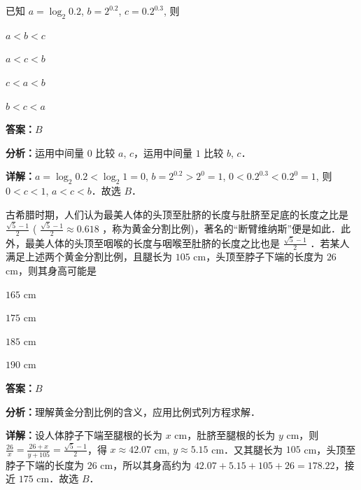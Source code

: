 \begin{question}[points=5]
已知 $a = \log_2 0.2$, $b = 2^{0.2}$, $c = 0.2^{0.3}$, 则
\begin{choices}
  \item $a < b < c$
  \item $a < c < b$
  \item $c < a < b$
  \item $b < c < a$
\end{choices}
\begin{solution}
\textbf{答案：}$B$

\textbf{分析：}运用中间量 $0$ 比较 $a$, $c$，运用中间量 $1$ 比较 $b$, $c$．

\textbf{详解：}$a = \log_2 0.2 < \log_2 1 = 0$, $b = 2^{0.2} > 2^0 = 1$, $0 < 0.2^{0.3} < 0.2^0 = 1$, 则 $0 < c < 1$, $a < c < b$．故选 $B$．
\end{solution}
\end{question}

\begin{question}[points=5]
古希腊时期，人们认为最美人体的头顶至肚脐的长度与肚脐至足底的长度之比是 $\frac{\sqrt{5} - 1}{2}$ ( $\frac{\sqrt{5} - 1}{2} \approx 0.618$ ，称为黄金分割比例)，著名的“断臂维纳斯”便是如此．此外，最美人体的头顶至咽喉的长度与咽喉至肚脐的长度之比也是 $\frac{\sqrt{5} - 1}{2}$ ．若某人满足上述两个黄金分割比例，且腿长为 $105$ cm，头顶至脖子下端的长度为 $26$ cm，则其身高可能是
\begin{choices}
  \item $165$ cm
  \item $175$ cm
  \item $185$ cm
  \item $190$ cm
\end{choices}
\begin{solution}
\textbf{答案：}$B$

\textbf{分析：}理解黄金分割比例的含义，应用比例式列方程求解．

\textbf{详解：}设人体脖子下端至腿根的长为 $x$ cm，肚脐至腿根的长为 $y$ cm，则 $\frac{26}{x} = \frac{26 + x}{y + 105} = \frac{\sqrt{5} - 1}{2}$，得 $x \approx 42.07$ cm, $y \approx 5.15$ cm．又其腿长为 $105$ cm，头顶至脖子下端的长度为 $26$ cm，所以其身高约为 $42.07 + 5.15 + 105 + 26 = 178.22$，接近 $175$ cm．故选 $B$．
\end{solution}
\end{question}

